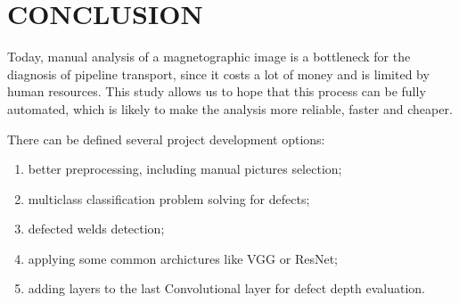 \section{CONCLUSION}
\label{CONCLUSION}
Today, manual analysis of a magnetographic image is a bottleneck for the diagnosis of pipeline transport, since it costs a lot of money and is limited by human resources. This study allows us to hope that this process can be fully automated, which is likely to make the analysis more reliable, faster and cheaper.

There can be defined several project development options:
\begin{enumerate}
	\item better preprocessing, including manual pictures selection;
	\item multiclass classification problem solving for defects;
	\item defected welds detection;
	\item applying some common archictures like VGG or ResNet;
	\item adding layers to the last Convolutional layer for defect depth evaluation.
\end{enumerate}